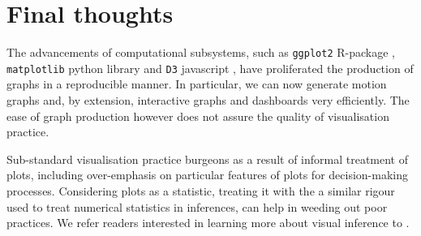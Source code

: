 \documentclass[ijds,nonblindrev]{informs-ijds}
\makeatletter
\renewcommand\st[1]{\@bsphack\@esphack}%
\makeatother
\begin{document}

\section{Final thoughts}\label{sec:conclude}

The advancements of computational subsystems, such as \texttt{ggplot2} R-package \citep{ggplot2}, \texttt{matplotlib} python library \citep{Hunter:2007} and \texttt{D3} javascript \citep{D3}, have proliferated the production of graphs in a reproducible manner. In particular, we can now generate motion graphs and, by extension, interactive graphs and dashboards very efficiently. The ease of graph production however does not assure the quality of visualisation practice.


Sub-standard visualisation practice burgeons as a result of informal treatment of plots, including over-emphasis on particular features of plots for decision-making processes. Considering plots as a statistic, treating it with the a similar rigour used to treat numerical statistics in inferences, can help in weeding out poor practices. We refer readers interested in learning more about visual inference to \cite{vanderplas2020testing}.  

\end{document}
